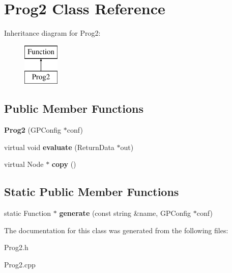 \hypertarget{class_prog2}{\section{Prog2 Class Reference}
\label{class_prog2}
}
Inheritance diagram for Prog2\-:\begin{figure}[H]
\begin{center}
\leavevmode
\includegraphics[height=2.000000cm]{class_prog2}
\end{center}
\end{figure}
\subsection*{Public Member Functions}
\begin{DoxyCompactItemize}
\item 
\hypertarget{class_prog2_a484a9c7ee3c73a01e04a6c40a724ba70}{{\bfseries Prog2} (G\-P\-Config $\ast$conf)}\label{class_prog2_a484a9c7ee3c73a01e04a6c40a724ba70}

\item 
\hypertarget{class_prog2_a119d9652b5ad96835e3aa49feeecfbda}{virtual void {\bfseries evaluate} (Return\-Data $\ast$out)}\label{class_prog2_a119d9652b5ad96835e3aa49feeecfbda}

\item 
\hypertarget{class_prog2_ab08249153b686963d3991d25d78f6827}{virtual Node $\ast$ {\bfseries copy} ()}\label{class_prog2_ab08249153b686963d3991d25d78f6827}

\end{DoxyCompactItemize}
\subsection*{Static Public Member Functions}
\begin{DoxyCompactItemize}
\item 
\hypertarget{class_prog2_a6c0efb0ed015721372c384c2dab8cf2e}{static Function $\ast$ {\bfseries generate} (const string \&name, G\-P\-Config $\ast$conf)}\label{class_prog2_a6c0efb0ed015721372c384c2dab8cf2e}

\end{DoxyCompactItemize}


The documentation for this class was generated from the following files\-:\begin{DoxyCompactItemize}
\item 
Prog2.\-h\item 
Prog2.\-cpp\end{DoxyCompactItemize}
